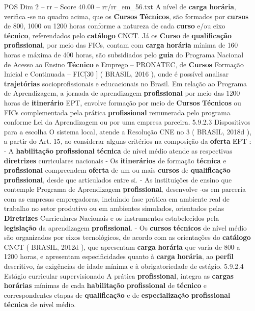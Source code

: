 \begin{textsample}{POS Dim 2 – rr – Score 40.00 – rr/rr\_em\_56.txt}  \label{ex:f2_pos_101}
A nível de \textbf{carga} \textbf{horária}, verifica -se no quadro acima, que os \textbf{Cursos} \textbf{Técnicos}, são formados por \textbf{cursos} de 800, 1000 ou 1200 horas conforme a natureza de cada \textbf{curso} e/ou eixo \textbf{técnico}, referendados pelo \textbf{catálogo} CNCT.
Já os \textbf{Curso} de \textbf{qualificação} \textbf{profissional}, por meio das FICs, contam com \textbf{carga} \textbf{horária} mínima de 160 horas e máxima de 400 horas, são subsidiados pelo \textbf{guia} do Programa Nacional de Acesso ao Ensino \textbf{Técnico} e Emprego – PRONATEC, de \textbf{Cursos} Formação Inicial e Continuada – FIC[30 ] ( BRASIL, 2016 ), onde é possível analisar \textbf{trajetórias} socioprofissionais e educacionais no Brasil.
Em relação ao Programa de Aprendizagem, a jornada de aprendizagem \textbf{profissional} por meio das 1200 horas de \textbf{itinerário} EPT, envolve formação por meio de \textbf{Cursos} \textbf{Técnicos} ou FICs complementada pela prática \textbf{profissional} remunerada pelo programa conforme Lei da Aprendizagem ou por uma empresa parceira. 5.9.2.3 Dispositivos para a escolha O sistema local, atende a Resolução CNE no 3 ( BRASIL, 2018d ), a partir do Art. 15, ao considerar alguns critérios na composição da \textbf{oferta} EPT : - A \textbf{habilitação} \textbf{profissional} \textbf{técnica} de nível médio atende as respectivas \textbf{diretrizes} curriculares nacionais - Os \textbf{itinerários} de formação \textbf{técnica} e \textbf{profissional} compreendem \textbf{oferta} de um ou mais \textbf{cursos} de \textbf{qualificação} \textbf{profissional}, desde que articulados entre si. - As instituições de ensino que contemple Programa de Aprendizagem \textbf{profissional}, desenvolve -os em parceria com as empresas empregadoras, incluindo fase prática em ambiente real de trabalho no setor produtivo ou em ambientes simulados, orientados pelas \textbf{Diretrizes} Curriculares Nacionais e os instrumentos estabelecidos pela \textbf{legislação} da aprendizagem \textbf{profissional}. - Os \textbf{cursos} \textbf{técnicos} de nível médio são organizados por eixos tecnológicos, de acordo com as orientações do \textbf{catálogo} CNCT ( BRASIL, 2012d ), que apresentam \textbf{carga} \textbf{horária} que varia de 800 a 1200 horas, e apresentam especificidades quanto à \textbf{carga} \textbf{horária}, ao \textbf{perfil} descritivo, às exigências de idade mínima e à obrigatoriedade de estágio. 5.9.2.4 Estágio curricular supervisionado A prática \textbf{profissional}, integra as \textbf{cargas} \textbf{horárias} mínimas de cada \textbf{habilitação} \textbf{profissional} de \textbf{técnico} e correspondentes etapas de \textbf{qualificação} e de \textbf{especialização} \textbf{profissional} \textbf{técnica} de nível médio.

\end{textsample}
